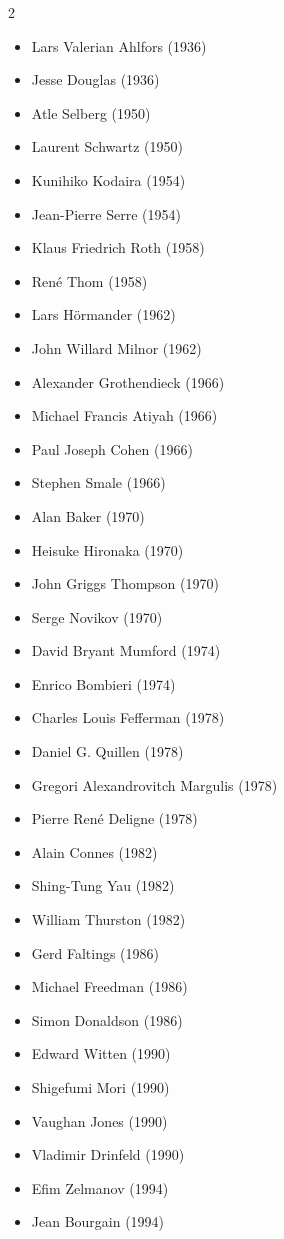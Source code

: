 \documentclass[12pt,a4paper]{book}
\theoremstyle{definition}
\theoremstyle{remark}
\begin{document}
\begin{multicols}{2}
\begin{itemize}
\item Lars Valerian Ahlfors (1936)
\item Jesse Douglas (1936)
\item Atle Selberg (1950)
\item Laurent Schwartz (1950)
\item Kunihiko Kodaira (1954)
\item Jean-Pierre Serre (1954)
\item Klaus Friedrich Roth (1958)
\item René Thom (1958)
\item Lars Hörmander (1962)
\item John Willard Milnor (1962)
\item Alexander Grothendieck (1966)
\item Michael Francis Atiyah (1966)
\item Paul Joseph Cohen (1966)
\item Stephen Smale (1966)
\item Alan Baker (1970)
\item Heisuke Hironaka (1970)
\item John Griggs Thompson (1970)
\item Serge Novikov (1970)
\item David Bryant Mumford (1974)
\item Enrico Bombieri (1974)
\item Charles Louis Fefferman (1978)
\item Daniel G. Quillen (1978)
\item Gregori Alexandrovitch Margulis (1978)
\item Pierre René Deligne (1978)
\item Alain Connes (1982)
\item Shing-Tung Yau (1982)
\item William Thurston (1982)
\item Gerd Faltings (1986)
\item Michael Freedman (1986)
\item Simon Donaldson (1986)
\item Edward Witten (1990)
\item Shigefumi Mori (1990)
\item Vaughan Jones (1990)
\item Vladimir Drinfeld (1990)
\item Efim Zelmanov (1994)
\item Jean Bourgain (1994)

\end{itemize}
\end{multicols}
\end{document}
